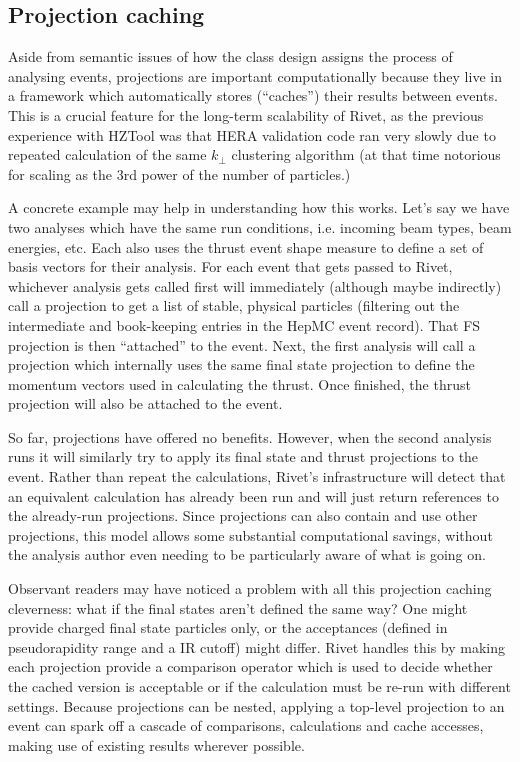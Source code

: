\subsection{Projection caching}

Aside from semantic issues of how the class design assigns the process of
analysing events, projections are important computationally because they live in
a framework which automatically stores (``caches'') their results between
events. This is a crucial feature for the long-term scalability of Rivet, as the
previous experience with HZTool was that HERA validation code ran very slowly
due to repeated calculation of the same $k_\perp$ clustering algorithm (at that
time notorious for scaling as the 3rd power of the number of particles.)

A concrete example may help in understanding how this works. Let's say we have
two analyses which have the same run conditions, i.e. incoming beam types, beam
energies, etc. Each also uses the thrust event shape measure to define a set of
basis vectors for their analysis. For each event that gets passed to Rivet,
whichever analysis gets called first will immediately (although maybe
indirectly) call a  projection to get a list of stable, physical
particles (filtering out the intermediate and book-keeping entries in the HepMC
event record). That FS projection is then ``attached'' to the event. Next, the
first analysis will call a  projection which internally uses the
same final state projection to define the momentum vectors used in calculating
the thrust. Once finished, the thrust projection will also be attached to the
event.

So far, projections have offered no benefits. However, when the second analysis
runs it will similarly try to apply its final state and thrust projections to
the event. Rather than repeat the calculations, Rivet's infrastructure will
detect that an equivalent calculation has already been run and will just return
references to the already-run projections. Since projections can also contain
and use other projections, this model allows some substantial computational
savings, without the analysis author even needing to be particularly aware of
what is going on.

Observant readers may have noticed a problem with all this projection caching
cleverness: what if the final states aren't defined the same way? One might
provide charged final state particles only, or the acceptances (defined in
pseudorapidity range and a IR \pT cutoff) might differ. Rivet handles this by
making each projection provide a comparison operator which is used to decide
whether the cached version is acceptable or if the calculation must be re-run
with different settings. Because projections can be nested, applying a top-level
projection to an event can spark off a cascade of comparisons, calculations and
cache accesses, making use of existing results wherever possible.


